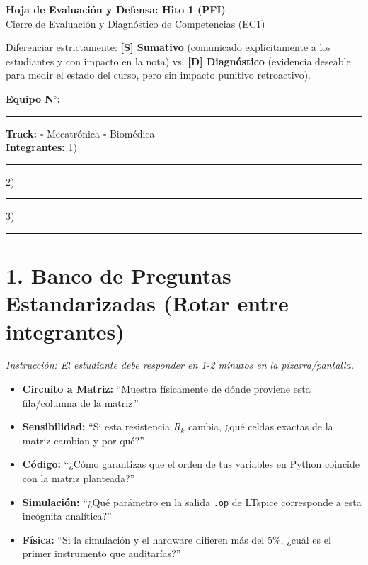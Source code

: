 \documentclass[11pt, a4paper]{article}
\begin{document}
\begin{center}
    {\LARGE \textbf{Hoja de Evaluación y Defensa: Hito 1 (PFI)}} \\[0.2cm]
    {\large Cierre de Evaluación y Diagnóstico de Competencias (EC1)}
\end{center}

\begin{tcolorbox}[caja_instruccion, title=Regla de Equidad (Fairness Rule)]
Diferenciar estrictamente: \textbf{[S] Sumativo} (comunicado explícitamente a los estudiantes y con impacto en la nota) vs. \textbf{[D] Diagnóstico} (evidencia deseable para medir el estado del curso, pero sin impacto punitivo retroactivo).
\end{tcolorbox}

\vspace{0.2cm}
\noindent\textbf{Equipo N$^\circ$:} \rule{3cm}{0.4pt} \hspace{1cm} \textbf{Track:} $\square$ Mecatrónica \quad $\square$ Biomédica \\[0.2cm]
\textbf{Integrantes:} 1) \rule{4.2cm}{0.4pt} 2) \rule{4.2cm}{0.4pt} 3) \rule{4.2cm}{0.4pt}

\section*{1. Banco de Preguntas Estandarizadas (Rotar entre integrantes)}
\textit{Instrucción: El estudiante debe responder en 1-2 minutos en la pizarra/pantalla.}
\begin{itemize}[itemsep=2pt]
    \item \textbf{Circuito a Matriz:} ``Muestra físicamente de dónde proviene esta fila/columna de la matriz.''
    \item \textbf{Sensibilidad:} ``Si esta resistencia $R_k$ cambia, ¿qué celdas exactas de la matriz cambian y por qué?''
    \item \textbf{Código:} ``¿Cómo garantizas que el orden de tus variables en Python coincide con la matriz planteada?''
    \item \textbf{Simulación:} ``¿Qué parámetro en la salida \texttt{.op} de LTspice corresponde a esta incógnita analítica?''
    \item \textbf{Física:} ``Si la simulación y el hardware difieren más del 5\%, ¿cuál es el primer instrumento que auditarías?''
\end{itemize}
\end{document}
